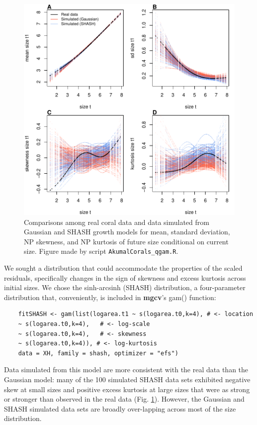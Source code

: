 \documentclass[12pt]{article}
\begin{document}
\begin{figure}[tbp]
	\centering
	\includegraphics[width=1.0\textwidth]{figures/coral_SHASH_fit.pdf}
	\caption{Comparisons among real coral data and data simulated from Gaussian and SHASH growth models for mean, standard deviation, NP skewness, and NP kurtosis of future size conditional on current size. Figure made by script \texttt{AkumalCorals\_qgam.R}.}
	\label{fig:coral_fit}
\end{figure} 

We sought a distribution that could accommodate the properties of the scaled residuals, specifically changes in the sign of skewness and excess kurtosis across initial sizes. 
We chose the sinh-arcsinh (SHASH) distribution, a four-parameter distribution that, conveniently, is included in \textbf{mgcv}'s gam() function:
\begin{lstlisting}
	fitSHASH <- gam(list(logarea.t1 ~ s(logarea.t0,k=4), # <- location 
	~ s(logarea.t0,k=4),   # <- log-scale
	~ s(logarea.t0,k=4),   # <- skewness
	~ s(logarea.t0,k=4)), # <- log-kurtosis
	data = XH, family = shash, optimizer = "efs")
\end{lstlisting}
Data simulated from this model are more consistent with the real data than the Gaussian model: many of the 100 simulated SHASH data sets exhibited negative skew at small sizes and positive excess kurtosis at large sizes that were as strong or stronger than observed in the real data (Fig. \ref{fig:coral_fit}). 
However, the Gaussian and SHASH simulated data sets are broadly over-lapping across most of the size distribution. 
 
\end{document}
